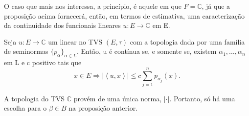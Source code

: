 \documentclass[../distribution_theory_notes.tex]{subfiles}
\begin{document}
     \begin{tcolorbox}[
     skin=enhanced,
     title=Observação,
     fonttitle=\bfseries,
   colframe=black,
     colbacktitle=cyan!75!white, 
     colback=cyan!15,
     colbacklower=black,
   coltitle=black,
     drop fuzzy shadow,
     ]
     O caso que mais nos interessa, a princípio, é aquele em que \(F=\mathbb{C}\), já que a proposição acima fornecerá, então, em termos de estimativa, uma caracterização da continuidade dos funcionais lineares \(u:E\rightarrow \mathbb{C}\) em E.
     \end{tcolorbox}

   \begin{crl*}
     Seja \(u:E\rightarrow \mathbb{C}\) um linear no TVS \((E, \tau )\) com a topologia dada por uma família de seminormas \(\{p_{\alpha }\}_{\alpha\in L}.\) Então, u é contínua se, e somente se, existem \(\alpha_{1},\dotsc , \alpha_{n}\) em L e c positivo tais que 
       \[
         x\in E \Rightarrow |\left< u, x \right>|\leq c\sum\limits_{j=1}^{n}p_{\alpha_{j}}(x).
       \]
   \end{crl*}
  \begin{proof*}
    A topologia do TVS \(\mathbb{C}\) provém de uma única norma, \(|\cdot |\). Portanto, só há uma escolha para o \(\beta \in B\) na proposição anterior. \qedsymbol
  \end{proof*}
\end{document}
